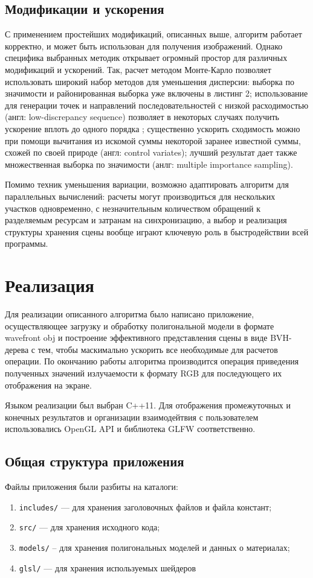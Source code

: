 \documentclass[12pt]{article}
\begin{document}
\subsection{Модификации и ускорения}
С применением простейших модификаций, описанных выше, алгоритм работает корректно, и может быть использован для получения изображений. Однако специфика выбранных методик открывает огромный простор для различных модификаций и ускорений. Так, расчет методом Монте-Карло позволяет использовать широкий набор методов для уменьшения дисперсии: выборка по значимости и районированная выборка уже включены в листинг 2; использование для генерации точек и направлений последовательностей с низкой расходимостью (англ: low-discrepancy sequence) позволяет в некоторых случаях получить ускорение вплоть до одного порядка \cite{Kel96}; существенно ускорить сходимость можно при помощи вычитания из искомой суммы некоторой заранее известной суммы, схожей по своей природе (англ: control variates); лучший результат дает также множественная выборка по значимости (анлг: multiple importance sampling).

Помимо техник уменьшения вариации, возможно адаптировать алгоритм для параллельных вычислений: расчеты могут производиться  для нескольких участков одновременно, с незначительным количеством обращений к разделяемым ресурсам и затранам на синхронизацию, а выбор и реализация структуры хранения сцены вообще играют ключевую роль в быстродействии всей программы. 
\newpage\section{Реализация}
Для реализации описанного алгоритма было написано приложение, осуществляющее загрузку и обработку полигональной модели в формате wavefront obj и построение эффективного представления сцены в виде BVH-дерева с тем, чтобы маскимально ускорить все необходимые для расчетов операции. По окончанию работы алгоритма производится операция приведения полученных значений излучаемости к формату RGB для последующего их отображения на экране.

Языком реализации был выбран C++11. Для отображения промежуточных и конечных результатов и организации взаимодейтвия с пользователем использовались OpenGL API и библиотека GLFW соответственно.
\subsection{Общая структура приложения}
Файлы приложения были разбиты на каталоги: 
\begin{enumerate}
\item[] \texttt{includes/} --- для хранения заголовочных файлов и файла констант;
\item[] \texttt{src/} --- для хранения исходного кода;
\item[] \texttt{models/} -- для хранения полигональных моделей и данных о материалах;
\item[] \texttt{glsl/} --- для хранения используемых шейдеров
\end{enumerate}
\end{document}
